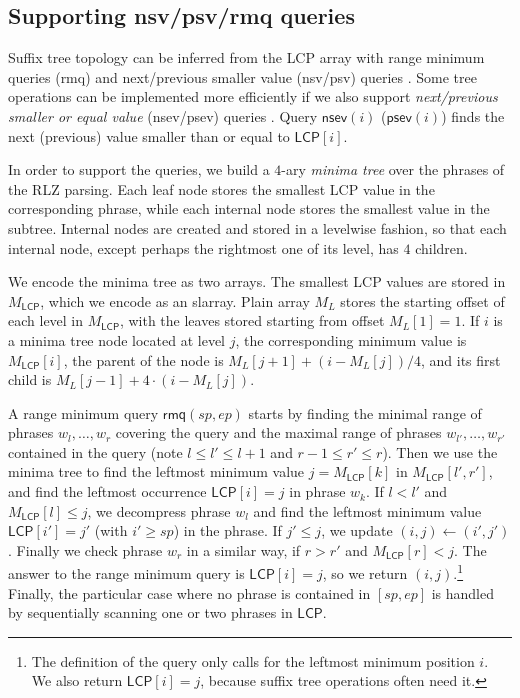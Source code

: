 \documentclass[a4paper,11pt]{llncs}
\newcommand{\LCP}{\textsf{LCP}}
\newcommand{\mLCP}{\ensuremath{\mathsf{LCP}}}
\newcommand{\RLZ}{\textsf{RLZ}}
\newcommand{\slarray}{\textsf{slarray}}
\newcommand{\nsv}{\textsf{nsv}}
\newcommand{\nsev}{\textsf{nsev}}
\newcommand{\psv}{\textsf{psv}}
\newcommand{\psev}{\textsf{psev}}
\newcommand{\rmq}{\textsf{rmq}}
\newcommand{\mpsev}{\ensuremath{\mathsf{psev}}}
\newcommand{\mnsev}{\ensuremath{\mathsf{nsev}}}
\newcommand{\mrmq}{\ensuremath{\mathsf{rmq}}}
\begin{document}
\subsection{Supporting \nsv/\psv/\rmq{} queries}

Suffix tree topology can be inferred from the \LCP{} array with range minimum
queries (\rmq) and next/previous smaller value (\nsv/\psv) queries
\cite{Fischer2009a}. Some tree operations can be implemented more efficiently
if we also support \emph{next/previous smaller or equal value} (\nsev/\psev)
queries \cite{Abeliuk2013}. Query $\mnsev(i)$ ($\mpsev(i)$) finds the next
(previous) value smaller than or equal to $\mLCP[i]$.

In order to support the queries, we build a $4$-ary \emph{minima tree} over
the phrases of the \RLZ{} parsing. Each leaf node stores the smallest \LCP{}
value in the corresponding phrase, while each internal node stores the
smallest value in the subtree. Internal nodes are created and stored in a
levelwise fashion, so that each internal node, except perhaps the rightmost
one of its level, has $4$ children.

We encode the minima tree as two arrays. The smallest \LCP{} values are
stored in $M_{\mLCP}$, which we encode as an \slarray. Plain array $M_{L}$
stores the starting offset of each level in $M_{\mLCP}$, with the leaves
stored starting from offset $M_{L}[1] = 1$. If $i$ is a minima tree node
located at level $j$, the corresponding minimum value is $M_{\mLCP}[i]$, the
parent of the node is $M_{L}[j+1] + (i - M_{L}[j]) / 4$, and its first child
is $M_{L}[j-1] + 4 \cdot (i - M_{L}[j])$.

A range minimum query $\mrmq(sp,ep)$ starts by finding the minimal range of
phrases $w_{l}, \dotsc, w_{r}$ covering the query and the maximal range of
phrases $w_{l'}, \dotsc, w_{r'}$ contained in the query (note $l \le l' \le
l+1$ and $r-1 \le r' \le r$). Then we use the
minima tree to find the leftmost minimum value $j = M_{\mLCP}[k]$ in
$M_{\mLCP}[l',r']$, and find the leftmost occurrence $\mLCP[i] = j$ in phrase
$w_{k}$. If $l < l'$ and $M_{\mLCP}[l] \le j$, we decompress phrase $w_{l}$
and find the leftmost minimum value $\mLCP[i'] = j'$ (with $i' \ge sp$) in the
phrase. If $j' \le j$, we update $(i,j) \leftarrow (i',j')$. Finally we check
phrase $w_{r}$ in a similar way, if $r > r'$ and $M_{\mLCP}[r] < j$. The answer
to the range minimum query is $\mLCP[i] = j$, so we return
$(i,j)$.\footnote{The definition of the query only calls for the leftmost
minimum position $i$. We also return $\mLCP[i] = j$, because suffix tree
operations often need it.} Finally, the particular case where no phrase is
contained in $[sp,ep]$ is handled by sequentially scanning one or two phrases
in $\LCP$.
\end{document}
